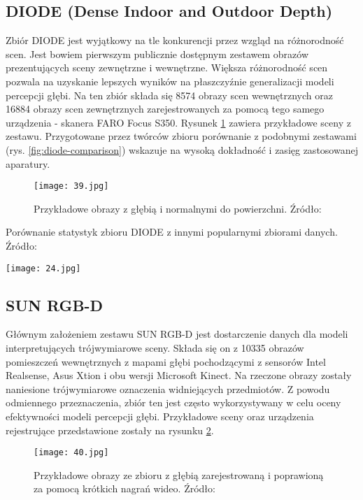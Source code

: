 \subsection{DIODE (Dense Indoor and Outdoor Depth)}
Zbiór DIODE \cite{vasiljevic2019} jest wyjątkowy na tle konkurencji przez wzgląd na różnorodność scen. Jest bowiem pierwszym publicznie dostępnym zestawem obrazów prezentujących sceny zewnętrzne i wewnętrzne. Większa różnorodność scen pozwala na uzyskanie lepszych wyników na płaszczyźnie generalizacji modeli percepcji głębi. Na ten zbiór składa się 8574 obrazy scen wewnętrznych oraz 16884 obrazy scen zewnętrznych zarejestrowanych za pomocą tego samego urządzenia - skanera FARO Focus S350. Rysunek \ref{fig:diode-example} zawiera przykładowe sceny z zestawu. Przygotowane przez twórców zbioru porównanie z podobnymi zestawami (rys. \ref{fig:diode-comparison}) wskazuje na wysoką dokładność i zasięg zastosowanej aparatury.
\begin{figure}[H]
    \centering
    \texttt{[image: 39.jpg]}
    \caption{Przykładowe obrazy z głębią i normalnymi do powierzchni. Źródło: \cite{vasiljevic2019}}
    \label{fig:diode-example}
\end{figure}
\begin{table}[H]
    \centering
    \caption{Porównanie statystyk zbioru DIODE z innymi popularnymi zbiorami danych. Źródło: \cite{vasiljevic2019}}
    \texttt{[image: 24.jpg]}
    \label{fig:diode-comparison}
\end{table}

\subsection{SUN RGB-D}
Głównym założeniem zestawu SUN RGB-D \cite{song2015} jest dostarczenie danych dla modeli interpretujących trójwymiarowe sceny. Składa się on z 10335 obrazów pomieszczeń wewnętrznych z mapami głębi pochodzącymi z sensorów Intel Realsense, Asus Xtion i obu wersji Microsoft Kinect. Na rzeczone obrazy zostały naniesione trójwymiarowe oznaczenia widniejących przedmiotów. Z powodu odmiennego przeznaczenia, zbiór ten jest często wykorzystywany w celu oceny efektywności modeli percepcji głębi. Przykładowe sceny oraz urządzenia rejestrujące przedstawione zostały na rysunku \ref{fig:sunrgbd-comparison}.
\begin{figure}[H]
    \centering
    \texttt{[image: 40.jpg]}
    \caption{Przykładowe obrazy ze zbioru z głębią zarejestrowaną i poprawioną za pomocą krótkich nagrań wideo. Źródło: \cite{song2015}}
    \label{fig:sunrgbd-comparison}
\end{figure}

